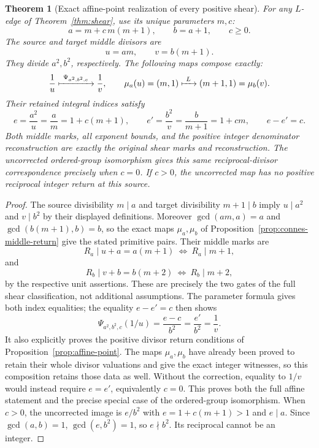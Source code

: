 \documentclass[11pt]{article}
\newtheorem{theorem}{Theorem}[section]
\theoremstyle{definition}\newtheorem{definition}[theorem]{Definition}
\theoremstyle{remark}\newtheorem{remark}[theorem]{Remark}
\begin{document}
\begin{theorem}[Exact affine-point realization of every positive shear]
\label{thm:full-connes-shear}
For any \(L\)-edge of Theorem~\ref{thm:shear}, use
its unique parameters \(m,c\):
\[
 a=m+c\,m(m+1),\qquad b=a+1,\qquad c\ge0.
\]
The source and target middle divisors are
\[
 u=am,\qquad v=b(m+1).
\]
They divide \(a^2,b^2\), respectively.  The following
maps compose exactly:
\[
 \frac1u
 \xmapsto{\ \Psi_{a^2,b^2,c}\ }\frac1v,\qquad
 \mu_a(u)=(m,1)\xmapsto{\ L\ }(m+1,1)=\mu_b(v).
\]
Their retained integral indices satisfy
\[
 e=\frac{a^2}{u}=\frac am=1+c(m+1),\qquad
 e'=\frac{b^2}{v}=\frac b{m+1}=1+cm,\qquad e-e'=c.
\]
Both middle marks, all exponent bounds, and the
positive integer denominator reconstruction are
exactly the original shear marks and reconstruction.
The uncorrected ordered-group isomorphism gives this
same reciprocal-divisor correspondence precisely
when \(c=0\).  If \(c>0\), the uncorrected map has
no positive reciprocal integer return at this source.
\end{theorem}
\begin{proof}
The source divisibility \(m\mid a\) and target
divisibility \(m+1\mid b\) imply \(u\mid a^2\)
and \(v\mid b^2\) by their displayed definitions.
Moreover
\(\gcd(am,a)=a\) and \(\gcd(b(m+1),b)=b\),
so the exact maps \(\mu_a,\mu_b\) of
Proposition~\ref{prop:connes-middle-return}
give the stated primitive pairs.
Their middle marks are
\[
 R_a\mid u+a=a(m+1)
     \ \Longleftrightarrow\ R_a\mid m+1,
\]
and
\[
 R_b\mid v+b=b(m+2)
     \ \Longleftrightarrow\ R_b\mid m+2 ,
\]
by the respective unit assertions.  These are
precisely the two gates of the full shear
classification, not additional assumptions.
The parameter formula gives both index equalities;
the equality \(e-e'=c\) then shows
\[
 \Psi_{a^2,b^2,c}(1/u)=\frac{e-c}{b^2}
                         =\frac{e'}{b^2}=\frac1v .
\]
It also explicitly proves the positive divisor
return conditions of Proposition~\ref{prop:affine-point}.
The maps \(\mu_a,\mu_b\) have already been proved
to retain their whole divisor valuations and give
the exact integer witnesses, so this composition
retains those data as well.
Without the correction, equality to \(1/v\)
would instead require \(e=e'\), equivalently \(c=0\).
This proves both the full affine statement and the
precise special case of the ordered-group
isomorphism.  When \(c>0\), the uncorrected image is
\(e/b^2\) with \(e=1+c(m+1)>1\) and \(e\mid a\).
Since \(\gcd(a,b)=1\), \(\gcd(e,b^2)=1\), so
\(e\nmid b^2\).  Its reciprocal cannot be an integer.
\end{proof}
\end{document}
